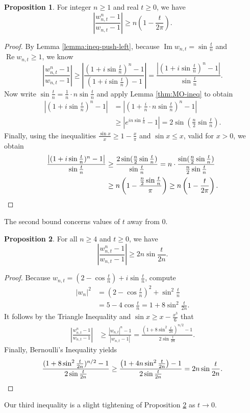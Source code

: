 \documentclass[11pt]{article}
\theoremstyle{definition}
\newtheorem{prop}{Proposition}
\renewcommand{\Re}{\operatorname{Re}}
\renewcommand{\Im}{\operatorname{Im}}
\newcommand{\abs}[1]{\left|#1\right|}
\begin{document}
\begin{prop}\label{prop:linear-near-zero}
	For integer $n\geq 1$ and real $t\geq 0$, we have
	\[
	\abs{\frac{w_{n,t}^n - 1}{w_{n,t} - 1}} \geq n\left(1 - \frac t{2\pi}\right).
	\]
\end{prop}

\begin{proof}
	By Lemma \ref{lemma:ineq-push-left}, because $\Im w_{n,t} = \sin\tfrac tn$ and $\Re w_{n,t} \geq 1$, we know
	\[
	\abs{\frac{w_{n,t}^n - 1}{w_{n,t} - 1}} \geq \abs{\frac{(1 + i\sin \frac tn)^n - 1}{(1 + i\sin \frac tn) - 1}} = \frac{\abs{(1 + i\sin \frac tn)^n - 1}}{\sin\frac tn}.
	\]
	Now write $\sin \frac tn = \tfrac 1n\cdot n\sin\tfrac tn$ and apply Lemma \ref{thm:MO-ineq} to obtain 
	\begin{align*}
		\abs{\left(1 + i\sin \frac tn\right)^n - 1} &= \abs{\left(1 + \frac in\cdot n\sin \frac tn\right)^n-1} \\
		&\geq \abs{e^{in\sin\frac tn} - 1} = 2\sin\left(\frac n2\sin\frac tn\right).
	\end{align*}
	Finally, using the inequalities $\tfrac{\sin x}x \geq 1 - \frac x\pi$ and $\sin x \leq x$, valid for $x > 0$, we obtain 
	\begin{align*}
		\frac{\abs{(1 + i\sin \frac tn)^n - 1}}{\sin\frac tn} &\geq \frac{2\sin(\frac n2\sin\frac tn)}{\sin\frac tn}
		= n\cdot\frac{\sin(\frac n2\sin \frac tn)}{\frac n2\sin\frac tn}\\
		&\geq n\left(1 - \frac{\frac n2\sin\frac tn}{\pi}\right)
		\geq n\left(1 - \frac t{2\pi}\right). \qedhere
	\end{align*}
\end{proof}

The second bound concerns values of $t$ away from $0$.

\begin{prop}\label{prop:simple-ineq}
	For all $n\geq 4$ and $t\geq 0$, we have
	\[
	\abs{\frac{w_{n,t}^n - 1}{w_{n,t} - 1}} \geq 2n\sin\frac t{2n}.
	\]
\end{prop}

\begin{proof}
	Because $w_{n,t} = (2-\cos\tfrac tn) + i\sin\tfrac tn$, compute
	\begin{align*}
		\abs{w_n}^2 &= \left(2 - \cos\frac tn\right)^2 + \sin^2\frac tn\\
		&= 5 - 4\cos\frac tn
		= 1 + 8\sin^2 \frac{t}{2n}.
	\end{align*}
	It follows by the Triangle Inequality and $\sin x \geq x - \tfrac{x^3}6$ that
	\begin{align*}
		\abs{\frac{w_{n,t}^n - 1}{w_{n,t} - 1}} &\geq \frac{\abs{w_{n,t}}^n - 1}{\abs{w_{n,t} - 1}} 
		= \frac{(1 + 8\sin^2\frac t{2n})^{n/2} - 1}{2\sin\frac t{2n}}.
	\end{align*}
	Finally, Bernoulli's Inequality yields
	\[
	\frac{(1 + 8\sin^2\frac t{2n})^{n/2} - 1}{2\sin\frac t{2n}} \geq
	\frac{\big(1 + 4n\sin^2\frac t{2n}\big) - 1}{2\sin\frac t{2n}} = 2n\sin\frac t{2n}. \qedhere
	\]
\end{proof}
Our third inequality is a slight tightening of Proposition \ref{prop:simple-ineq} as $t\to 0$.
\end{document}
